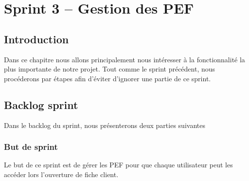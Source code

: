 \chapter{Sprint 3 – Gestion des PEF}
	
\section*{Introduction}
Dans ce chapitre nous allons principalement nous intéresser à la fonctionnalité la plus  importante de notre projet. Tout comme le sprint précédent, nous procéderons par étapes afin d’éviter d’ignorer une partie de ce sprint.

\section{Backlog sprint}
Dans le backlog du sprint, nous présenterons deux parties suivantes
\subsection{But de sprint}
Le but de ce sprint est de gérer les PEF pour que chaque utilisateur peut les accéder lors l’ouverture de fiche client.
